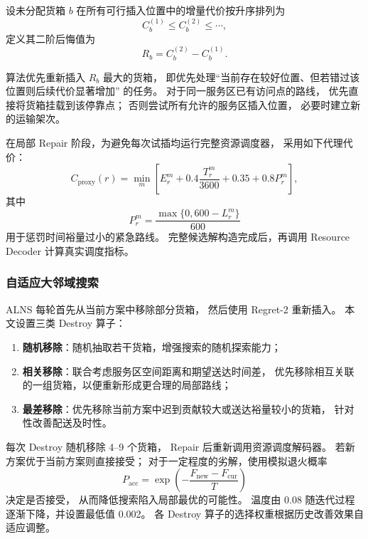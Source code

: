 设未分配货箱 $b$ 在所有可行插入位置中的增量代价按升序排列为
\[
C_b^{(1)}
\le
C_b^{(2)}
\le\cdots,
\]
定义其二阶后悔值为
\begin{equation}
	R_b
	=
	C_b^{(2)}-C_b^{(1)}.
	\label{eq:q2-regret}
\end{equation}

算法优先重新插入 $R_b$ 最大的货箱，
即优先处理``当前存在较好位置、但若错过该位置则后续代价显著增加''
的任务。
对于同一服务区已有访问点的路线，
优先直接将货箱挂载到该停靠点；
否则尝试所有允许的服务区插入位置，
必要时建立新的运输架次。

在局部 Repair 阶段，为避免每次试插均运行完整资源调度器，
采用如下代理代价：
\begin{equation}
	C_{\mathrm{proxy}}(r)
	=
	\min_m
	\left[
	E_r^m
	+
	0.4\frac{T_r^m}{3600}
	+
	0.35
	+
	0.8P_r^m
	\right],
	\label{eq:q2-proxy}
\end{equation}
其中
\[
P_r^m=
\frac{\max\{0,600-L_r^m\}}{600}
\]
用于惩罚时间裕量过小的紧急路线。
完整候选解构造完成后，再调用 Resource Decoder
计算真实调度指标。

\subsubsection{自适应大邻域搜索}

ALNS 每轮首先从当前方案中移除部分货箱，
然后使用 Regret-2 重新插入。
本文设置三类 Destroy 算子：

\begin{enumerate}[label=(\arabic*),leftmargin=3em]
	\item \textbf{随机移除}：随机抽取若干货箱，增强搜索的随机探索能力；
	\item \textbf{相关移除}：联合考虑服务区空间距离和期望送达时间差，
	优先移除相互关联的一组货箱，以便重新形成更合理的局部路线；
	\item \textbf{最差移除}：优先移除当前方案中迟到贡献较大或送达裕量较小的货箱，
	针对性改善配送及时性。
\end{enumerate}

每次 Destroy 随机移除 4--9 个货箱，
Repair 后重新调用资源调度解码器。
若新方案优于当前方案则直接接受；
对于一定程度的劣解，使用模拟退火概率
\begin{equation}
	P_{\mathrm{acc}}
	=
	\exp\left(
	-\frac{F_{\mathrm{new}}-F_{\mathrm{cur}}}{T}
	\right)
	\label{eq:q2-sa}
\end{equation}
决定是否接受，
从而降低搜索陷入局部最优的可能性。
温度由 0.08 随迭代过程逐渐下降，并设置最低值 0.002。
各 Destroy 算子的选择权重根据历史改善效果自适应调整。

